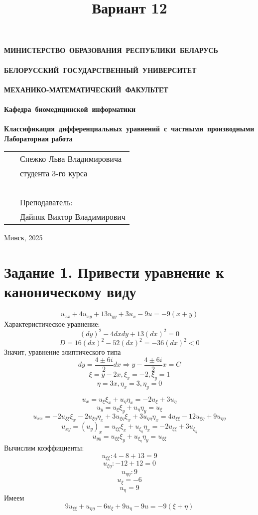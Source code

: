 \documentclass[a4paper,12pt]{article}
\begin{document}
\setcounter{page}{1}
\thispagestyle{empty}
\begin{center}
\bf
\vspace{4cm}
{
\mbox{МИНИСТЕРСТВО~ОБРАЗОВАНИЯ~РЕСПУБЛИКИ~БЕЛАРУСЬ} \\~\\
\mbox{БЕЛОРУССКИЙ~ГОСУДАРСТВЕННЫЙ~УНИВЕРСИТЕТ} \\~\\
\mbox{МЕХАНИКО-МАТЕМАТИЧЕСКИЙ~ФАКУЛЬТЕТ} \\~\\
\mbox{Кафедра~биомедицинской~информатики} \\~\\
}
\vspace{4cm}
\bf
\mbox{Классификация дифференциальных уравнений с частными производными}\\
\vspace{1cm}
\rm Лабораторная работа 
\vspace{3cm}
\end{center}
\begin{tabular}{ll}
\hspace{10.5cm}
&Снежко Льва Владимировича~\\
&студента 3-го курса\\~\\
&Преподаватель:\\
&Дайняк Виктор Владимирович
\end{tabular}
\vspace{7cm}
\begin{center}
Mинск, 2025
\end{center}
\clearpage
\restoregeometry
\title{Вариант 12}
\date{}
\maketitle
\section{Задание 1. Привести уравнение к каноническому виду}
$$u_{xx} + 4u_{xy} + 13u_{yy} + 3u_x - 9u = -9(x+y)$$
Характеристическое уравнение:
$$(dy)^2 - 4dxdy + 13(dx)^2 = 0$$
$$D = 16(dx)^2 - 52(dx)^2 = -36(dx)^2 < 0$$
Значит, уравнение элиптического типа
$$dy = \frac{4 \pm 6i}{2}dx \Rightarrow y - \frac{4 \pm 6i}{2}x = C$$
$$\xi = y - 2x, \xi_x = -2, \xi_y = 1$$
$$\eta = 3x, \eta_x = 3, \eta_y = 0$$

$$u_x = u_{\xi}\xi_x + u_{\eta}\eta_x = -2u_{\xi} + 3u_{\eta}$$
$$u_y = u_{\xi}\xi_y + u_{\eta}\eta_y = u_{\xi}$$
$$u_{xx} = -2u_{\xi\xi}\xi_x - 2u_{\xi\eta}\eta_x + 3u_{\xi\eta}\xi_x + 3u_{\eta\eta}\eta_x 
= 4u_{\xi\xi} - 12u_{\xi\eta}+9u_{\eta\eta}$$
$$u_{xy} = (u_y)_x = u_{\xi\xi}\xi_x + u_{\xi_\eta}\eta_x
= -2u_{\xi\xi} + 3u_{\xi_\eta}$$
$$u_{yy} = u_{\xi\xi}\xi_y + u_{\xi_\eta}\eta_y 
= u_{\xi\xi}$$
Вычислим коэффициенты:
$$u_{\xi\xi}: 4 - 8 + 13 = 9$$
$$u_{\xi\eta}: -12 + 12 = 0$$
$$u_{\eta\eta}: 9$$
$$u_{\xi} = -6$$
$$u_{\eta} = 9$$
Имеем
$$9u_{\xi\xi} + u_{\eta\eta} - 6u_{\xi} +9u_{\eta} - 9u = -9(\xi+\eta)$$
$$$$
\end{document}
